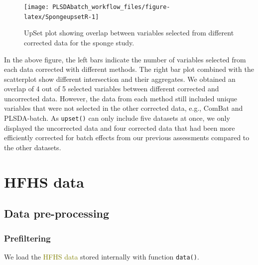 \documentclass[
]{book}
\newenvironment{Shaded}{\begin{snugshade}}{\end{snugshade}}
\newcommand{\AttributeTok}[1]{\textcolor[rgb]{0.77,0.63,0.00}{#1}}
\newcommand{\FunctionTok}[1]{\textcolor[rgb]{0.00,0.00,0.00}{#1}}
\newcommand{\NormalTok}[1]{#1}
\newcommand{\OtherTok}[1]{\textcolor[rgb]{0.56,0.35,0.01}{#1}}
\newcommand{\SpecialCharTok}[1]{\textcolor[rgb]{0.00,0.00,0.00}{#1}}
\newcommand{\StringTok}[1]{\textcolor[rgb]{0.31,0.60,0.02}{#1}}
\begin{document}
\begin{figure}

{\centering \texttt{[image: PLSDAbatch\_workflow\_files/figure-latex/SpongeupsetR-1]} 

}

\caption{UpSet plot showing overlap between variables selected from different corrected data for the sponge study.}\label{fig:SpongeupsetR}
\end{figure}

In the above figure, the left bars indicate the number of variables selected from each data corrected with different methods. The right bar plot combined with the scatterplot show different intersection and their aggregates. We obtained an overlap of 4 out of 5 selected variables between different corrected and uncorrected data. However, the data from each method still included unique variables that were not selected in the other corrected data, e.g., ComBat and PLSDA-batch. As \texttt{upset()} can only include five datasets at once, we only displayed the uncorrected data and four corrected data that had been more efficiently corrected for batch effects from our previous assessments compared to the other datasets.

\hypertarget{hfhs-data}{%
\section{HFHS data}\label{hfhs-data}}

\hypertarget{data-pre-processing-2}{%
\subsection{Data pre-processing}\label{data-pre-processing-2}}

\hypertarget{prefiltering}{%
\subsubsection{Prefiltering}\label{prefiltering}}

We load the \textcolor{olive}{HFHS data} stored internally with function \texttt{data()}.

\begin{Shaded}
\end{Shaded}
\end{document}
